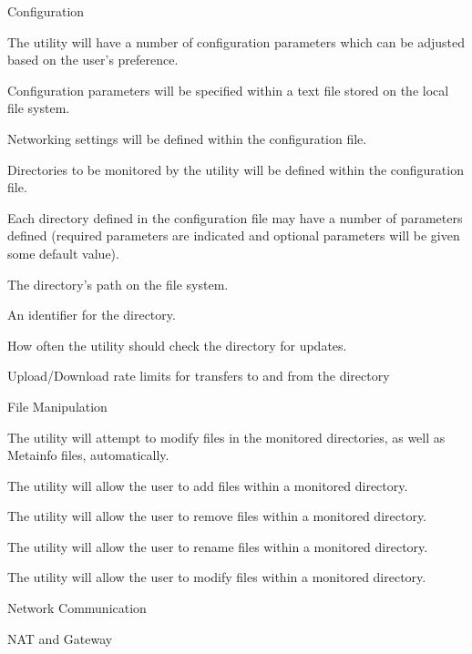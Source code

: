 \documentclass[12 pt]{article}
\begin{document}
\begin{enum}
\begin{enum}
\begin{enum}
			\end{enum}
			\item Configuration
			\begin{enum}
				\item The utility will have a number of configuration parameters which can be adjusted based on the user's preference.
				\item Configuration parameters will be specified within a text file stored on the local file system.
				\item Networking settings will be defined within the configuration file.
				\item Directories to be monitored by the utility will be defined within the configuration file.
				\item Each directory defined in the configuration file may have a number of parameters defined (required parameters are indicated and optional parameters will be given some default value).
				\begin{enum}
					\item The directory's path on the file system.
					\item An identifier for the directory.
					\item How often the utility should check the directory for updates.
					\item Upload/Download rate limits for transfers to and from the directory
				\end{enum}
			\end{enum}
			\item File Manipulation
			\begin{enum}
				\item The utility will attempt to modify files in the monitored directories, as well as Metainfo files, automatically.
				\item The utility will allow the user to add files within a monitored directory.
				\item The utility will allow the user to remove files within a monitored directory.
				\item The utility will allow the user to rename files within a monitored directory.
				\item The utility will allow the user to modify files within a monitored directory.
			\end{enum}
			\item Network Communication
			\begin{enum}
				\item NAT and Gateway
				\begin{enum}

\end{enum}
\end{enum}
\end{enum}
\end{enum}
\end{document}
